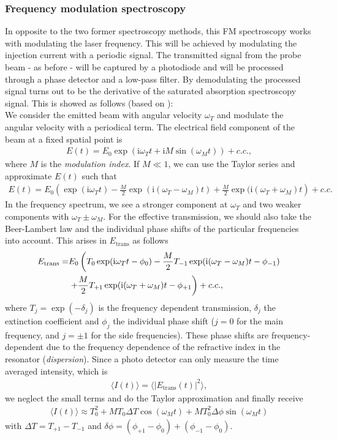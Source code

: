 \newpage
\subsubsection{Frequency modulation spectroscopy}
In opposite to the two former spectroscopy methods, this FM spectroscopy works with modulating the laser frequency. This will be achieved by modulating the injection current with a periodic signal. The transmitted signal from the probe beam - as before - will be captured by a photodiode and will be processed through a phase detector and a low-pass filter. By demodulating the processed signal turns out to be the derivative of the saturated absorption spectroscopy signal. This is showed as follows (based on \cite{lit:mpi_FM_spec}):\\
We consider the emitted beam with angular velocity $\omega_T$ and modulate the angular velocity with a periodical term. The electrical field component of the beam at a fixed spatial point is
\begin{align}
E(t)=E_0\exp\left(\mathrm{i}\omega_T t+\mathrm{i}M\sin(\omega_M t)\right)+c.c.,
\end{align}
where $M$ is the \emph{modulation index}. If $M\ll 1$, we can use the Taylor series and approximate $E(t)$ such that
\begin{align}
E(t)=E_0\left(\exp(\mathrm{i}\omega_T t)-\frac{M}{2}\exp(\mathrm{i}(\omega_T-\omega_M)t)+\frac{M}{2}\exp(\mathrm{i}(\omega_T+\omega_M)t\right)+c.c.
\end{align}
In the frequency spectrum, we see a stronger component at $\omega_T$ and two weaker components with $\omega_T\pm\omega_M$. For the effective transmission, we should also take the Beer-Lambert law and the individual phase shifts of the particular frequencies into account. This arises in $E_\text{trans}$ as follows
\begin{align}
E_\text{trans}=&E_0\left(T_0\exp(\mathrm{i}\omega_T t-\phi_0)-\frac{M}{2}T_{-1}\exp(\mathrm{i}(\omega_T-\omega_M)t-\phi_{-1})\right.\notag\\
&\left.+\frac{M}{2}T_{+1}\exp(\mathrm{i}(\omega_T+\omega_M)t-\phi_{+1}\right)+c.c.,
\end{align}
where $T_j=\exp(-\delta_j)$ is the frequency dependent transmission, $\delta_j$ the extinction coefficient and $\phi_j$ the individual phase shift ($j=0$ for the main frequency, and $j=\pm 1$ for the side frequencies). These phase shifts are frequency-dependent due to the frequency dependence of the refractive index in the resonator (\emph{dispersion}).
Since a photo detector can only measure the time averaged intensity, which is 
\begin{align}
\langle I(t)\rangle=\langle|E_\text{trans}(t)|^2\rangle,
\end{align}
we neglect the small terms and do the Taylor approximation and finally receive
\begin{align}
\langle I(t)\rangle\approx T_0^2+MT_0\Delta T\cos(\omega_M t)+MT_0^2\Delta\phi\sin(\omega_M t)
\end{align}
with $\Delta T=T_{+1}-T_{-1}$ and $\delta\phi=(\phi_{+1}-\phi_0)+(\phi_{-1}-\phi_0)$.

